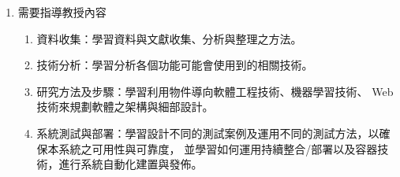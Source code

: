 \documentclass[12pt]{article}
\begin{document}
\begin{enumerate}
\begin{thebibliography}{99}
       Dong, Yu, Jingyang Hou, and Xuesong Lu. "An intelligent online judge system for programming training." Database Systems for Advanced Applications: 25th International Conference, DASFAA 2020, Jeju, South Korea, September 24–27, 2020, Proceedings, Part III 25. Springer International Publishing, 2020.
       Delen, Erhan, Jeffrey Liew, and Victor Willson. "Effects of interactivity and instructional scaffolding on learning: Self-regulation in online video-based environments." Computers \& Education 78 (2014): 312-320.
       api-client. Available from: https://github.com/online-judge-tools/api-client
       go-judge. Available from: https://github.com/criyle/go-judge
       JudgeServer. Available from: https://github.com/helsonxiao/JudgeServer
    \end{thebibliography} 

  \item 需要指導教授內容
    \begin{enumerate}
      \setlength{\parindent}{2em}
      \item 資料收集：學習資料與文獻收集、分析與整理之方法。
      \item 技術分析：學習分析各個功能可能會使用到的相關技術。
      \item 研究方法及步驟：學習利用物件導向軟體工程技術、機器學習技術、
      Web技術來規劃軟體之架構與細部設計。
      \item 系統測試與部署：學習設計不同的測試案例及運用不同的測試方法，以確保本系統之可用性與可靠度，
      並學習如何運用持續整合/部署以及容器技術，進行系統自動化建置與發佈。
    \end{enumerate}
\end{enumerate}
\end{document}
